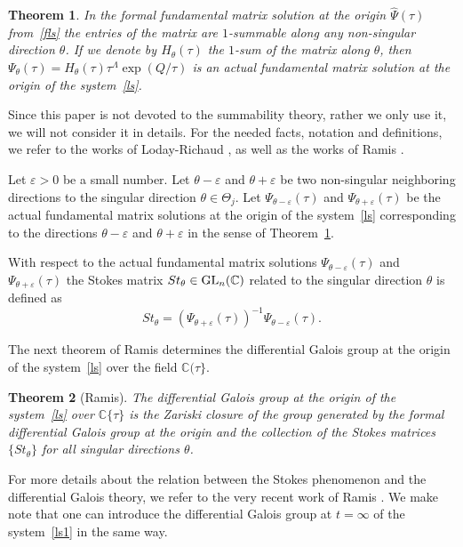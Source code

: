 \documentclass[pdftex]{sigma}
\numberwithin{equation}{section}
\newtheorem{Theorem}{Theorem}[section]
\begin{document}
 \begin{Theorem}\label{R}
 In the formal fundamental matrix solution at the origin $\hat{\Psi}(\tau)$ from~\eqref{fls} the entries of the
 matrix  are $1$-summable along any non-singular direction $\theta$. If we denote by $H_{\theta}(\tau)$
 the $1$-sum of the matrix  along $\theta$, then
 $\Psi_{\theta}(\tau)=H_{\theta}(\tau) \tau^{\Lambda} \exp(Q/\tau)$ is an actual fundamental matrix solution at the origin
 of the system~\eqref{ls}.
 \end{Theorem}
 Since this paper is not devoted to the summability theory, rather we only use it, we will not consider it in details.
 For the needed facts, notation and definitions, we refer to the works of Loday-Richaud \cite{LR}, as well as
 the works of Ramis \cite{R3, R2}.

 Let $\varepsilon > 0$ be a small number. Let $\theta-\varepsilon$ and $\theta+\varepsilon$ be two non-singular neighboring
 directions to the singular direction $\theta\in \Theta_j$. Let $\Psi_{\theta-\varepsilon}(\tau)$ and $\Psi_{\theta+\varepsilon}(\tau)$
 be the actual fundamental matrix solutions at the origin of the system~\eqref{ls} corresponding to
 the directions $\theta-\varepsilon$ and $\theta+\varepsilon$ in the sense of Theorem~\ref{R}.
 \begin{Definition}\label{Sto}
With respect to the actual fundamental matrix solutions $\Psi_{\theta-\varepsilon}(\tau)$ and $\Psi_{\theta+\varepsilon}(\tau)$
 	the Stokes matrix $St_{\theta}\in{\rm GL}_n(\mathbb{C})$ related to the singular direction $\theta$ is defined as
 	 \[
 	 St_{\theta}=\left(\Psi_{\theta+\varepsilon}(\tau)\right)^{-1} \Psi_{\theta-\varepsilon}(\tau) .
 	 \]
 \end{Definition}

 The next theorem of Ramis \cite{R3} determines the differential Galois group at the origin of the system~\eqref{ls} over
 the field $\mathbb{C}(\tau\}$.
 \begin{Theorem}[Ramis]\label{Ra}
 The differential Galois group at the origin of the system~\eqref{ls} over $\mathbb{C}\{\tau\}$ is the Zariski closure
 of the group generated by the formal differential Galois group at the origin and the collection of the Stokes
 matrices $\{St_{\theta}\}$ for all singular directions $\theta$.
 \end{Theorem}
 For more details about the relation between the Stokes phenomenon and the differential Galois theory, we refer to the very recent
 work of Ramis \cite{R1}.
 We make note that one can introduce the differential Galois group at $t=\infty$ of the system~\eqref{ls1} in the same way.
\end{document}
